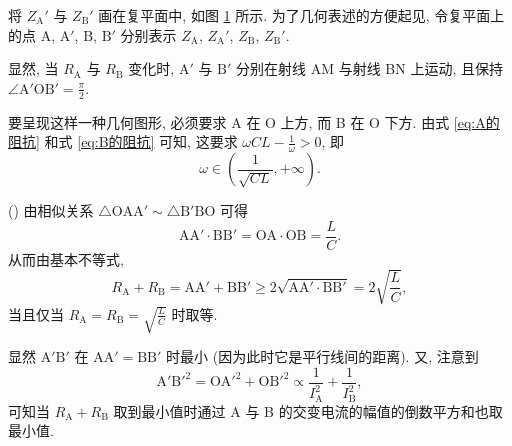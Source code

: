 \documentclass{article}
\newcounter{para}
\newcommand\mypara{\par\refstepcounter{para}(\thepara)\space}
\begin{document}
将 $Z_\mathrm A'$ 与 $Z_\mathrm B'$ 画在复平面中, 如图 \ref{fig:阻抗复平面} 所示.
为了几何表述的方便起见,
令复平面上的点 $\mathrm A$, $\mathrm A'$, $\mathrm B$, $\mathrm B'$
分别表示 $Z_\mathrm A$, $Z_\mathrm A'$, $Z_\mathrm B$, $Z_\mathrm B'$.

\begin{figure}[h!]
	\centering
	\caption{}
	\label{fig:阻抗复平面}
\end{figure}

显然, 当 $R_\mathrm A$ 与 $R_\mathrm B$ 变化时,
$\mathrm A'$ 与 $\mathrm B'$ 分别在射线 AM 与射线 BN 上运动,
且保持 $\angle\mathrm{A'OB'}=\frac\pi2$.

要呈现这样一种几何图形, 必须要求 A 在 O 上方, 而 B 在 O 下方.
由式 \ref{eq:A的阻抗} 和式 \ref{eq:B的阻抗} 可知, 这要求 $\omega CL-\frac1\omega>0$, 即
\begin{equation}
	\omega\in\left(\frac1{\sqrt{CL}},+\infty\right).
\end{equation}

\mypara
由相似关系 $\triangle\mathrm{OAA'}\sim\triangle\mathrm{B'BO}$ 可得
\begin{equation}
	\mathrm{AA'}\cdot\mathrm{BB'}=\mathrm{OA}\cdot\mathrm{OB}=\frac LC.
\end{equation}
从而由基本不等式,
\begin{equation}
	R_\mathrm A+R_\mathrm B=\mathrm{AA'}+\mathrm{BB'}\ge2\sqrt{\mathrm{AA'}\cdot\mathrm{BB'}}=2\sqrt{\frac LC},
\end{equation}
当且仅当 $R_\mathrm A=R_\mathrm B=\sqrt{\frac LC}$ 时取等.

显然 $\mathrm{A'B'}$ 在 $\mathrm{AA'}=\mathrm{BB'}$ 时最小 (因为此时它是平行线间的距离).
又, 注意到
\begin{equation}
	\mathrm{A'B'}^2=\mathrm{OA'}^2+\mathrm{OB'}^2\propto\frac1{I_\mathrm A^2}+\frac1{I_\mathrm B^2},
\end{equation}
可知当 $R_\mathrm A+R_\mathrm B$ 取到最小值时通过 A 与 B 的交变电流的幅值的倒数平方和也取最小值.
\end{document}
